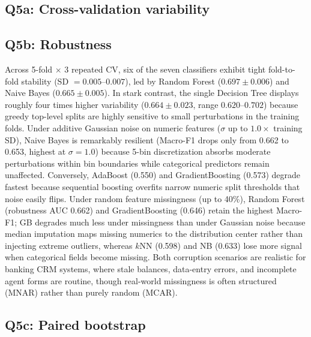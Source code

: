 \subsection{Q5a: Cross-validation variability}

\subsection{Q5b: Robustness}

Across 5-fold $\times$ 3 repeated CV, six of the seven classifiers exhibit tight fold-to-fold stability (SD $= 0.005$--$0.007$), led by Random Forest ($0.697 \pm 0.006$) and Naive Bayes ($0.665 \pm 0.005$). In stark contrast, the single Decision Tree displays roughly four times higher variability ($0.664 \pm 0.023$, range $0.620$--$0.702$) because greedy top-level splits are highly sensitive to small perturbations in the training folds. Under additive Gaussian noise on numeric features ($\sigma$ up to $1.0\times$ training SD), Naive Bayes is remarkably resilient (Macro-F1 drops only from 0.662 to 0.653, highest at $\sigma = 1.0$) because 5-bin discretization absorbs moderate perturbations within bin boundaries while categorical predictors remain unaffected. Conversely, AdaBoost (0.550) and GradientBoosting (0.573) degrade fastest because sequential boosting overfits narrow numeric split thresholds that noise easily flips. Under random feature missingness (up to 40\%), Random Forest (robustness AUC 0.662) and GradientBoosting (0.646) retain the highest Macro-F1; GB degrades much less under missingness than under Gaussian noise because median imputation maps missing numerics to the distribution center rather than injecting extreme outliers, whereas $k$NN (0.598) and NB (0.633) lose more signal when categorical fields become missing. Both corruption scenarios are realistic for banking CRM systems, where stale balances, data-entry errors, and incomplete agent forms are routine, though real-world missingness is often structured (MNAR) rather than purely random (MCAR).

\subsection{Q5c: Paired bootstrap}

